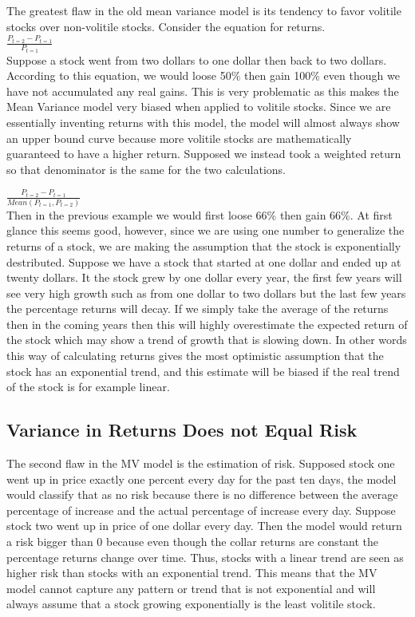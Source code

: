 \documentclass[english]{report}
\begin{document}
\Large{The greatest flaw in the old mean variance model is its tendency to favor volitile stocks over non-volitile stocks. Consider the equation for returns.}\\

\LARGE{\(\frac{P_{t=2}-P_{t=1}}{P_{t=1}}\)}\\

\Large{Suppose a stock went from two dollars to one dollar then back to two dollars. According to this equation, we would loose 50\% then gain 100\% even though we have not accumulated any real gains. This is very problematic as this makes the Mean Variance model very biased when applied to volitile stocks. Since we are essentially inventing returns with this model, the model will almost always show an upper bound curve because more volitile stocks are mathematically guaranteed to have a higher return. Supposed we instead took a weighted return so that denominator is the same for the two calculations.}

\LARGE{\(\frac{P_{t=2}-P_{t=1}}{Mean(P_{t=1},P_{t=2})}\)}\\

\Large{Then in the previous example we would first loose 66\% then gain 66\%. At first glance this seems good, however, since we are using one number to generalize the returns of a stock, we are making the assumption that the stock is exponentially destributed. Suppose we have a stock that started at one dollar and ended up at twenty dollars. It the stock grew by one dollar every year, the first few years will see very high growth such as from one dollar to two dollars but the last few years the percentage returns will decay. If we simply take the average of the returns then in the coming years then this will highly overestimate the expected return of the stock which may show a trend of growth that is slowing down. In other words this way of calculating returns gives the most optimistic assumption that the stock has an exponential trend, and this estimate will be biased if the real trend of the stock is for example linear. }

\subsection{Variance in Returns Does not Equal Risk}

\Large{The second flaw in the MV model is the estimation of risk. Supposed stock one went up in price exactly one percent every day for the past ten days, the model would classify that as no risk because there is no difference between the average percentage of increase and the actual percentage of increase every day. Suppose stock two went up in price of one dollar every day. Then the model would return a risk bigger than 0 because even though the collar returns are constant the percentage returns change over time. Thus, stocks with a linear trend are seen as higher risk than stocks with an exponential trend. This means that the MV model cannot capture any pattern or trend that is not exponential and will always assume that a stock growing exponentially is the least volitile stock.  }
\end{document}
